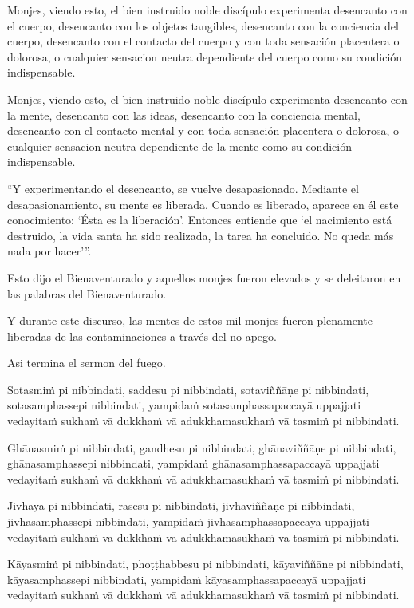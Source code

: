 Monjes, viendo esto, el bien instruido noble discípulo experimenta desencanto con el cuerpo, desencanto con los objetos tangibles, desencanto con la conciencia del cuerpo, desencanto con el contacto del cuerpo y con toda sensación placentera o dolorosa, o cualquier sensacion neutra dependiente del cuerpo como su condición indispensable.


Monjes, viendo esto, el bien instruido noble discípulo experimenta desencanto con la mente, desencanto con las ideas, desencanto con la conciencia mental, desencanto con el contacto mental y con toda sensación placentera o dolorosa, o cualquier sensacion neutra dependiente de la mente como su condición indispensable.

“Y experimentando el desencanto, se vuelve desapasionado. Mediante el desapasionamiento, su mente es liberada. Cuando es liberado, aparece en él este conocimiento: ‘Ésta es la liberación’. Entonces entiende que ‘el nacimiento está destruido, la vida santa ha sido realizada, la tarea ha concluido. No queda más nada por hacer’”.

\enlargethispage{\baselineskip}

Esto dijo el Bienaventurado y aquellos monjes fueron elevados y se deleitaron en las palabras del Bienaventurado.

Y durante este discurso, las mentes de estos mil monjes fueron plenamente liberadas de las contaminaciones a través del no-apego.


Asi termina el sermon del fuego.

\clearpage

\paliText
\markboth{\paliTitle}{\rightmark}

Sotasmiṁ pi nibbindati, saddesu pi nibbindati, sotaviññāṇe pi
nibbindati, sotasamphassepi nibbindati, yampidaṁ sotasamphassapaccayā
uppajjati vedayitaṁ sukhaṁ vā dukkhaṁ vā adukkhamasukhaṁ vā tasmiṁ pi
nibbindati.

Ghānasmiṁ pi nibbindati, gandhesu pi nibbindati, ghānaviññāṇe pi
nibbindati, ghānasamphassepi nibbindati, yampidaṁ ghānasamphassapaccayā
uppajjati vedayitaṁ sukhaṁ vā dukkhaṁ vā adukkhamasukhaṁ vā tasmiṁ pi
nibbindati.

Jivhāya pi nibbindati, rasesu pi nibbindati, jivhāviññāṇe pi nibbindati,
jivhāsamphassepi nibbindati, yampidaṁ jivhāsamphassapaccayā uppajjati
vedayitaṁ sukhaṁ vā dukkhaṁ vā adukkhamasukhaṁ vā tasmiṁ pi nibbindati.

Kāyasmiṁ pi nibbindati, phoṭṭhabbesu pi nibbindati, kāyaviññāṇe pi
nibbindati, kāyasamphassepi nibbindati, yampidaṁ kāyasamphassapaccayā
uppajjati vedayitaṁ sukhaṁ vā dukkhaṁ vā adukkhamasukhaṁ vā tasmiṁ pi
nibbindati.

